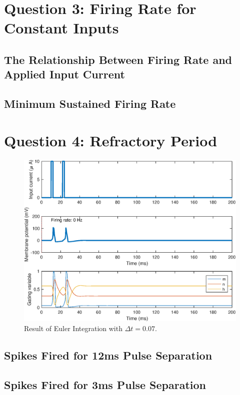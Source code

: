 \documentclass[11pt, oneside]{article}
\begin{document}
\section{Question 3: Firing Rate for Constant Inputs}

\subsection{The Relationship Between Firing Rate and Applied Input Current}



\subsection{Minimum Sustained Firing Rate}

\section{Question 4: Refractory Period}

\begin{figure}[ht!]
\centering
\includegraphics[width=1\textwidth]{simulate_hh_dt_7.eps}
\caption{Result of Euler Integration with $\Delta t = 0.07$.}
\label{fig:euler_integration_seven}
\end{figure}

\subsection{Spikes Fired for 12ms Pulse Separation}

\subsection{Spikes Fired for 3ms Pulse Separation}
\end{document}
